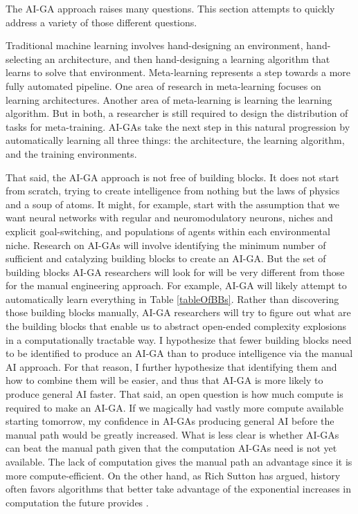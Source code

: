 \documentclass{article}
\begin{document}
The AI-GA approach raises many questions. This section attempts to quickly address a variety of those different questions. 

Traditional machine learning involves hand-designing an environment, hand-selecting an architecture, and then hand-designing a learning algorithm that learns to solve that environment. Meta-learning represents a step towards a more fully automated pipeline. One area of research in meta-learning focuses on learning architectures. Another area of meta-learning is learning the learning algorithm. But in both, a researcher is still required to design the distribution of tasks for meta-training. AI-GAs take the next step in this natural progression by automatically learning all three things: the architecture, the learning algorithm, and the training environments. 

That said, the AI-GA approach is not free of building blocks. It does not start from scratch, trying to create intelligence from nothing but the laws of physics and a soup of atoms. It might, for example, start with the assumption that we want neural networks with regular and neuromodulatory neurons, niches and explicit goal-switching, and populations of agents within each environmental niche. Research on AI-GAs will involve identifying the minimum number of sufficient and catalyzing building blocks to create an AI-GA. But the set of building blocks AI-GA researchers will look for will be very different from those for the manual engineering approach. For example, AI-GA will likely attempt to automatically learn everything in Table \ref{tableOfBBs}. Rather than discovering those building blocks manually, AI-GA researchers will try to figure out what are the building blocks that enable us to abstract open-ended complexity explosions in a computationally tractable way. I hypothesize that fewer building blocks need to be identified to produce an AI-GA than to produce intelligence via the manual AI approach. For that reason, I further hypothesize that identifying them and how to combine them will be easier, and thus that AI-GA is more likely to produce general AI faster. That said, an open question is how much compute is required to make an AI-GA. If we magically had vastly more compute available starting tomorrow, my confidence in AI-GAs producing general AI before the manual path would be greatly increased. What is less clear is whether AI-GAs can beat the manual path given that the computation AI-GAs need is not yet available. The lack of computation gives the manual path an advantage since it is more compute-efficient. On the other hand, as Rich Sutton has argued, history often favors algorithms that better take advantage of the exponential increases in computation the future provides \cite{sutton2019bitter}. 
\end{document}
